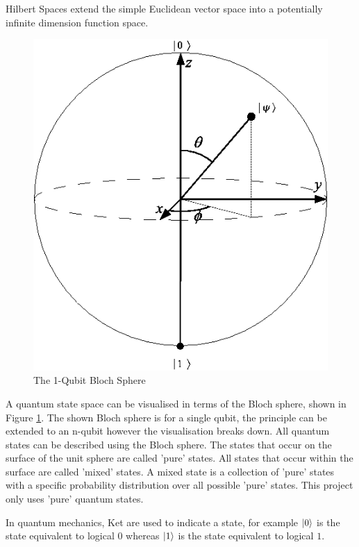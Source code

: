 Hilbert Spaces extend the simple Euclidean vector space into a potentially infinite dimension function space.
\begin{figure}
\centering
\includegraphics[scale=0.5]{Bloch.png}
\caption{The 1-Qubit Bloch Sphere \cite{QuantikiBlochSphereImage}}
\label{BlochSphere}
\end{figure}
A quantum state space can be visualised in terms of the Bloch sphere, shown in Figure \ref{BlochSphere}.
The shown Bloch sphere is for a single qubit, the principle can be extended to an n-qubit however the visualisation breaks down.
All quantum states can be described using the Bloch sphere.
The states that occur on the surface of the unit sphere are called 'pure' states.
All states that occur within the surface are called 'mixed' states.
A mixed state is a collection of 'pure' states with a specific probability distribution over all possible 'pure' states.
This project only uses 'pure' quantum states.

In quantum mechanics, Ket are used to indicate a state, for example $\left\vert{0}\right\rangle$ is the state equivalent to logical $0$ whereas $\left\vert{1}\right\rangle$ is the state equivalent to logical $1$.

